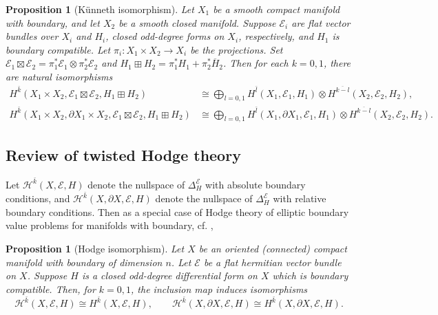 \documentclass[12pt]{amsart}
\theoremstyle{plain}
\newtheorem{proposition}[theorem]{Proposition}
\theoremstyle{definition}
\theoremstyle{remark}
\begin{document}
\begin{proposition}[K\"unneth isomorphism]\label{prop:ku}
Let $X_1$ be a smooth compact manifold with boundary, and let $X_2$ be a smooth closed manifold.
Suppose ${\mathcal E}_i$ are flat vector bundles over $X_i$ and $H_i$, closed
odd-degree forms on $X_i$, respectively, and $H_1$ is boundary compatible.
Let $\pi_i\colon X_1\times X_2\to X_i$ be the projections.
Set ${\mathcal E}_1\boxtimes{\mathcal E}_2=\pi_1^*{\mathcal E}_1\otimes\pi_2^*{\mathcal E}_2$ and
$H_1\boxplus H_2=\pi_1^*H_1+\pi_2^*{{\overline H_2}}$.
Then for each $k=0,1$,
there are natural isomorphisms
\begin{align*}
H^{\bar k}(X_1\times X_2,{\mathcal E}_1\boxtimes{\mathcal E}_2,H_1\boxplus H_2) 
& \cong\bigoplus_{l=0,1}H^{\bar l}(X_1,{\mathcal E}_1,H_1)
\otimes H^{\overline{k-l}}(X_2,{\mathcal E}_2,H_2),\\
H^{\bar k}(X_1\times X_2, \partial X_1 \times X_2,{\mathcal E}_1\boxtimes{\mathcal E}_2,H_1\boxplus H_2) 
& \cong\bigoplus_{l=0,1}H^{\bar l}(X_1, \partial X_1,{\mathcal E}_1,H_1)
\otimes H^{\overline{k-l}}(X_2,{\mathcal E}_2,H_2).   
\end{align*}
\end{proposition}

\subsection{Review of twisted Hodge theory}

Let ${\mathcal H}^{\bar k}(X,{\mathcal E},H)$ denote the nullspace of $\Delta^{\mathcal E}_H$ with absolute boundary conditions,
and ${\mathcal H}^{\bar k}(X, \partial X, {\mathcal E},H)$ denote the nullspace of $\Delta^{\mathcal E}_H$ with relative boundary conditions.
Then as a special case of Hodge theory of elliptic boundary value problems for manifolds with boundary, cf. \cite{GilkeyBook, Schwarz},

\begin{proposition}[Hodge isomorphism]\label{prop:hodge}
Let $X$ be an oriented {{(connected)}} compact manifold with boundary of dimension $n$.
Let ${\mathcal E}$ be a flat hermitian vector bundle on $X$. 
Suppose $H$ is a closed odd-degree differential form on $X$ which is boundary compatible.
Then, for $k=0,1$, the inclusion map induces isomorphisms
$$
{\mathcal H}^{\bar k}(X,{\mathcal E},H)  \cong  H^{\bar k}(X,{\mathcal E},H), \qquad
{\mathcal H}^{\bar k}(X, \partial X, {\mathcal E},H)  \cong H^{\bar k}(X, \partial X, {\mathcal E},H).
$$
\end{proposition}
\end{document}
